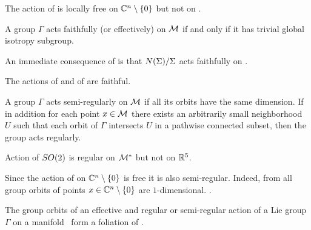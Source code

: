 \begin{example}
The action  of  is locally free on $\mathbb{C}^{n}\setminus\{0\}$ but not on .
\end{example}

\begin{definition}
\label{def:faithfull}
A group $\Gamma$ acts faithfully (or effectively) on $\mathcal{M}$ if and only if it has trivial global isotropy subgroup.
\end{definition}

An immediate consequence of 
is that $N(\Sigma)/\Sigma$ acts faithfully on \Fix{\Sigma}.


\begin{example}
 The actions  of  and  of  are faithful.
\end{example}

\begin{definition}
\label{def:regular}
A group $\Gamma$ acts semi-regularly on $\mathcal{M}$ if all its orbits have the same dimension.
If in addition for each point $x\in \mathcal{M}$
there exists an arbitrarily small neighborhood $U$ such that each orbit of $\Gamma$ intersects $U$ in a pathwise connected subset, then the group
acts regularly.
\end{definition}

\begin{example}
 Action  of $SO(2)$ is regular on $\mathcal{M}^*$ but not on $\mathbb{R}^{5}$.
\end{example}


\begin{example}
Since the action  of  on $\mathbb{C}^{n}\setminus\{0\}$ is free it is also semi-regular. Indeed, from  all group orbits of points $x\in\mathbb{C}^{n}\setminus\{0\}$ are $1$-dimensional.
.
\end{example}

The group orbits of an effective and regular or semi-regular action of a Lie group $\Gamma$ on a manifold \Manif\ form a foliation of \Manif{}.

